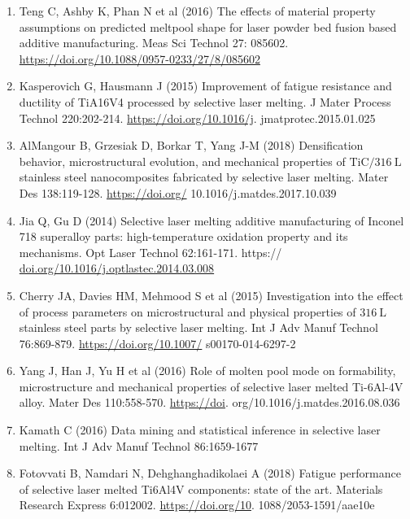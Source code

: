 \documentclass[10pt]{article}
\begin{document}
\begin{enumerate}
  \item Teng C, Ashby K, Phan N et al (2016) The effects of material property assumptions on predicted meltpool shape for laser powder bed fusion based additive manufacturing. Meas Sci Technol 27: 085602. \href{https://doi.org/10.1088/0957-0233/27/8/085602}{https://doi.org/10.1088/0957-0233/27/8/085602}

  \item Kasperovich G, Hausmann J (2015) Improvement of fatigue resistance and ductility of TiA16V4 processed by selective laser melting. J Mater Process Technol 220:202-214. \href{https://doi.org/10.1016/j}{https://doi.org/10.1016/j}. jmatprotec.2015.01.025

  \item AlMangour B, Grzesiak D, Borkar T, Yang J-M (2018) Densification behavior, microstructural evolution, and mechanical properties of $\mathrm{TiC} / 316 \mathrm{~L}$ stainless steel nanocomposites fabricated by selective laser melting. Mater Des 138:119-128. \href{https://doi.org/}{https://doi.org/} 10.1016/j.matdes.2017.10.039

  \item Jia Q, Gu D (2014) Selective laser melting additive manufacturing of Inconel 718 superalloy parts: high-temperature oxidation property and its mechanisms. Opt Laser Technol 62:161-171. https:// \href{http://doi.org/10.1016/j.optlastec.2014.03.008}{doi.org/10.1016/j.optlastec.2014.03.008}

  \item Cherry JA, Davies HM, Mehmood S et al (2015) Investigation into the effect of process parameters on microstructural and physical properties of $316 \mathrm{~L}$ stainless steel parts by selective laser melting. Int J Adv Manuf Technol 76:869-879. \href{https://doi.org/10.1007/}{https://doi.org/10.1007/} s00170-014-6297-2

  \item Yang J, Han J, Yu H et al (2016) Role of molten pool mode on formability, microstructure and mechanical properties of selective laser melted Ti-6Al-4V alloy. Mater Des 110:558-570. \href{https://doi}{https://doi}. org/10.1016/j.matdes.2016.08.036

  \item Kamath C (2016) Data mining and statistical inference in selective laser melting. Int J Adv Manuf Technol 86:1659-1677

  \item Fotovvati B, Namdari N, Dehghanghadikolaei A (2018) Fatigue performance of selective laser melted Ti6Al4V components: state of the art. Materials Research Express 6:012002. \href{https://doi.org/10}{https://doi.org/10}. 1088/2053-1591/aae10e


\end{enumerate}
\end{document}

